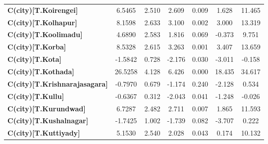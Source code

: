 \begin{center}
\begin{tabular}{lcccccc}
\textbf{C(city)[T.Koirengei]}                                                                       &       6.5465  &        2.510     &     2.609  &         0.009        &        1.628    &       11.465     \\
\textbf{C(city)[T.Kolhapur]}                                                                        &       8.1598  &        2.633     &     3.100  &         0.002        &        3.000    &       13.319     \\
\textbf{C(city)[T.Koolimadu]}                                                                       &       4.6890  &        2.583     &     1.816  &         0.069        &       -0.373    &        9.751     \\
\textbf{C(city)[T.Korba]}                                                                           &       8.5328  &        2.615     &     3.263  &         0.001        &        3.407    &       13.659     \\
\textbf{C(city)[T.Kota]}                                                                            &      -1.5842  &        0.728     &    -2.176  &         0.030        &       -3.011    &       -0.158     \\
\textbf{C(city)[T.Kothada]}                                                                         &      26.5258  &        4.128     &     6.426  &         0.000        &       18.435    &       34.617     \\
\textbf{C(city)[T.Krishnarajasagara]}                                                               &      -0.7970  &        0.679     &    -1.174  &         0.240        &       -2.128    &        0.534     \\
\textbf{C(city)[T.Kullu]}                                                                           &      -0.6367  &        0.312     &    -2.043  &         0.041        &       -1.248    &       -0.026     \\
\textbf{C(city)[T.Kurundwad]}                                                                       &       6.7287  &        2.482     &     2.711  &         0.007        &        1.865    &       11.593     \\
\textbf{C(city)[T.Kushalnagar]}                                                                     &      -1.7425  &        1.002     &    -1.739  &         0.082        &       -3.707    &        0.222     \\
\textbf{C(city)[T.Kuttiyady]}                                                                       &       5.1530  &        2.540     &     2.028  &         0.043        &        0.174    &       10.132     \\

\end{tabular}
\end{center}
